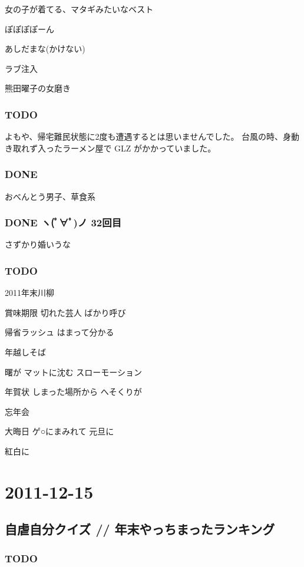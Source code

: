 \documentclass[11pt]{article}
\begin{document}
女の子が着てる、マタギみたいなベスト

ぽぽぽぽーん

あしだまな(かけない)

ラブ注入

熊田曜子の女磨き
\subsubsection{\textbf{TODO}}
\label{sec-19_1_2}

よもや、帰宅難民状態に2度も遭遇するとは思いませんでした。
台風の時、身動き取れず入ったラーメン屋で GLZ がかかっていました。
\subsubsection{\textbf{DONE}}
\label{sec-19_1_3}

おべんとう男子、草食系
\subsubsection{\textbf{DONE} ヽ(ﾟ∀ﾟ)ノ 32回目}
\label{sec-19_1_4}

さずかり婚いうな
\subsubsection{\textbf{TODO}}
\label{sec-19_1_5}

2011年末川柳

賞味期限 切れた芸人 ばかり呼び

帰省ラッシュ はまって分かる

年越しそば

曙が マットに沈む スローモーション

年賀状 しまった場所から へそくりが

忘年会

大晦日 ゲ○にまみれて 元旦に

紅白に
\section{2011-12-15}
\label{sec-20}
\subsection{自虐自分クイズ // 年末やっちまったランキング}
\label{sec-20_1}
\subsubsection{\textbf{TODO}}
\label{sec-20_1_1}
\end{document}
